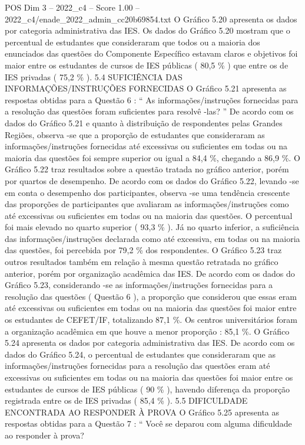 \begin{textsample}{POS Dim 3 – 2022\_c4 – Score 1.00 – 2022\_c4/enade\_2022\_admin\_cc20b69854.txt}
O Gráfico 5.20 apresenta os dados por categoria administrativa das IES.
Os dados do Gráfico 5.20 mostram que o percentual de estudantes que consideraram que todos ou a maioria dos enunciados das questões do Componente Específico estavam claros e objetivos foi maior entre os estudantes de cursos de IES públicas ( 80,5 \% ) que entre os de IES privadas ( 75,2 \% ). 5.4 SUFICIÊNCIA DAS INFORMAÇÕES/INSTRUÇÕES FORNECIDAS O Gráfico 5.21 apresenta as respostas obtidas para a Questão 6 : “ As informações/instruções fornecidas para a resolução das questões foram suficientes para resolvê -las? ” De acordo com os dados do Gráfico 5.21 e quanto à distribuição de respondentes pelas Grandes Regiões, observa -se que a proporção de estudantes que consideraram as informações/instruções fornecidas até excessivas ou suficientes em todas ou na maioria das questões foi sempre superior ou igual a 84,4 \%, chegando a 86,9 \%.
O Gráfico 5.22 traz resultados sobre a questão tratada no gráfico anterior, porém por quartos de desempenho.
De acordo com os dados do Gráfico 5.22, levando -se em conta o desempenho dos participantes, observa -se uma tendência crescente das proporções de participantes que avaliaram as informações/instruções como até excessivas ou suficientes em todas ou na maioria das questões.
O percentual foi mais elevado no quarto superior ( 93,3 \% ).
Já no quarto inferior, a suficiência das informações/instruções declarada como até excessiva, em todas ou na maioria das questões, foi percebida por 79,2 \% dos respondentes.
O Gráfico 5.23 traz outros resultados também em relação à mesma questão retratada no gráfico anterior, porém por organização acadêmica das IES.
De acordo com os dados do Gráfico 5.23, considerando -se as informações/instruções fornecidas para a resolução das questões ( Questão 6 ), a proporção que considerou que essas eram até excessivas ou suficientes em todas ou na maioria das questões foi maior entre os estudantes de CEFET/IF, totalizando 87,1 \%.
Os centros universitários foram a organização acadêmica em que houve a menor proporção : 85,1 \%.
O Gráfico 5.24 apresenta os dados por categoria administrativa das IES.
De acordo com os dados do Gráfico 5.24, o percentual de estudantes que consideraram que as informações/instruções fornecidas para a resolução das questões eram até excessivas ou suficientes em todas ou na maioria das questões foi maior entre os estudantes de cursos de IES públicas ( 90 \% ), havendo diferença da proporção registrada entre os de IES privadas ( 85,4 \% ). 5.5 DIFICULDADE ENCONTRADA AO RESPONDER À PROVA O Gráfico 5.25 apresenta as respostas obtidas para a Questão 7 : “ Você se deparou com alguma dificuldade ao responder à prova?

\end{textsample}
